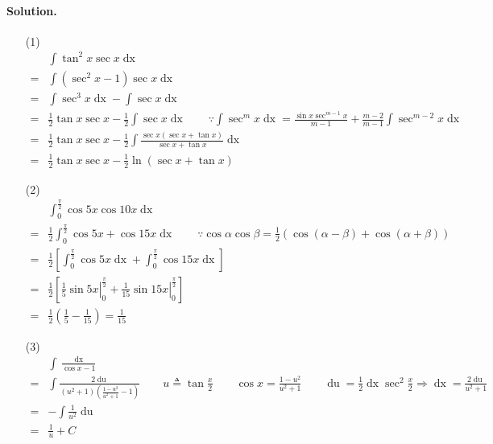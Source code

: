 \paragraph{Solution.} 
\begin{itemize}
	\item [(1)]{
		\begin{align*}
		&\int \tan^2 x \sec x \mathop{dx}\\
		=& \int \left(\sec^2x-1\right) \sec x \mathop{dx}\\
		=& \int \sec^3x\mathop{dx} -\int \sec x \mathop{dx}\\
		=& \frac{1}{2}\tan x \sec x - \frac{1}{2}\int \sec x \mathop{dx}\qquad\because \int \sec^mx\mathop{dx}=\frac{\sin x \sec^{m-1}x}{m-1} + \frac{m-2}{m-1}\int\sec^{m-2}x\mathop{dx}\\
		=& \frac{1}{2}\tan x \sec x - \frac{1}{2}\int \frac{\sec x\left(\sec x+\tan x\right)}{\sec x+\tan x} \mathop{dx}\\
		=& \frac{1}{2}\tan x \sec x - \frac{1}{2}\ln\left(\sec x+\tan x\right)
		\end{align*}
	}
	\item [(2)]{
		\begin{align*}
		& \int_0^\frac{\pi}{2} \cos 5x \cos 10x \mathop{dx}\\
		=& \frac{1}{2}\int_0^\frac{\pi}{2} \cos 5x + \cos 15x \mathop{dx} \qquad\because \cos\alpha\cos\beta=\frac{1}{2}\left(\cos\left(\alpha-\beta\right)+\cos\left(\alpha+\beta\right)\right)\\
		=& \frac{1}{2}\left[\int_0^\frac{\pi}{2} \cos 5x \mathop{dx} + \int_0^\frac{\pi}{2} \cos 15x \mathop{dx}\right]\\
		=& \frac{1}{2}\left[\left.\frac{1}{5}\sin5x\right|_0^\frac{\pi}{2}+\left.\frac{1}{15}\sin15x\right|_0^\frac{\pi}{2}\right]\\
		=& \frac{1}{2}\left(\frac{1}{5}-\frac{1}{15}\right) = \frac{1}{15}
		\end{align*}
	}
	\item [(3)]{
		\begin{align*}
		& \int \frac{\mathop{dx}}{\cos x - 1}\\
		=& \int \frac{2\mathop{du}}{\left(u^2+1\right)\left(\frac{1-u^2}{u^2+1}-1\right)}\qquad u\triangleq \tan\frac{x}{2}\qquad\cos x=\frac{1-u^2}{u^2+1}\qquad \mathop{du}=\frac{1}{2}\mathop{dx}\sec^2\frac{x}{2}\Rightarrow\mathop{dx}=\frac{2\mathop{du}}{u^2+1}\\
		=& -\int \frac{1}{u^2}\mathop{du}\\
		=& \frac{1}{u} + C\\

\end{align*}}
\end{itemize}
